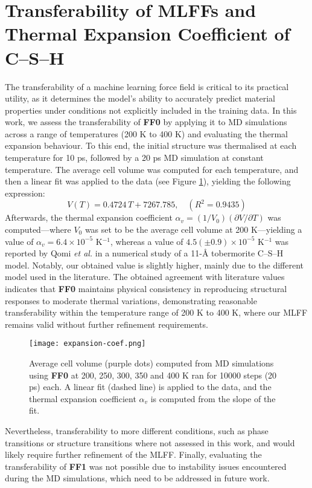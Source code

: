 \section{Transferability of MLFFs and Thermal Expansion Coefficient of C--S--H}
\label{sec:transferability}
The transferability of a machine learning force field is critical to its practical utility, as it determines the model's ability to accurately predict material properties under conditions not explicitly included in the training data. In this work, we assess the transferability of \textbf{FF0} by applying it to MD simulations across a range of temperatures (200 K to 400 K) and evaluating the thermal expansion behaviour. To this end, the initial structure was thermalised at each temperature for 10 ps, followed by a 20 ps MD simulation at constant temperature. The average cell volume was computed for each temperature, and then a linear fit \cite{Xu2007} was applied to the data (see Figure \ref{expansion-coef}), yielding the following expression:
\begin{equation}
    \label{eq:thermal-expansion}
    V(T) = 0.4724\,T + 7267.785, \quad (R^2 = 0.9435)
\end{equation}
Afterwards, the thermal expansion coefficient $\alpha_v=(1/V_0)(\partial V/\partial T)$ was computed---where $V_0$ 
was set to be the average cell volume at 200 K---yielding a value of $\alpha_v = 6.4 \times 10^{-5}$ K$^{-1}$, whereas a value of $4.5(\pm 0.9) \times 10^{-5}$ K$^{-1}$ was reported by Qomi \emph{et al.} \cite{AbdolhosseiniQomi2015} in a numerical study of a 11-\AA{} tobermorite  C--S--H model. Notably, our obtained value is slightly higher, mainly due to the different model used in the literature. The obtained agreement with literature values indicates that \textbf{FF0} maintains physical consistency in reproducing structural responses to moderate thermal variations, demonstrating reasonable transferability within the temperature range of 200 K to 400 K, where our MLFF remains valid without further refinement requirements.
\begin{figure}[H]
    \centering
    \texttt{[image: expansion-coef.png]}
    \caption{
    Average cell volume (purple dots) computed from MD simulations using \textbf{FF0} at 200, 250, 300, 350 and 400 K ran for 10000 steps (20 ps) each. A linear fit (dashed line) is applied to the data, and the thermal expansion coefficient $\alpha_v$ is computed from the slope of the fit.}
    \label{expansion-coef}
\end{figure}
Nevertheless, transferability to more different conditions, such as phase transitions or structure transitions where not assessed in this work, and would likely require further refinement of the MLFF. Finally, evaluating the transferability of \textbf{FF1} was not possible due to instability issues encountered during the MD simulations, which need to be addressed in future work.




